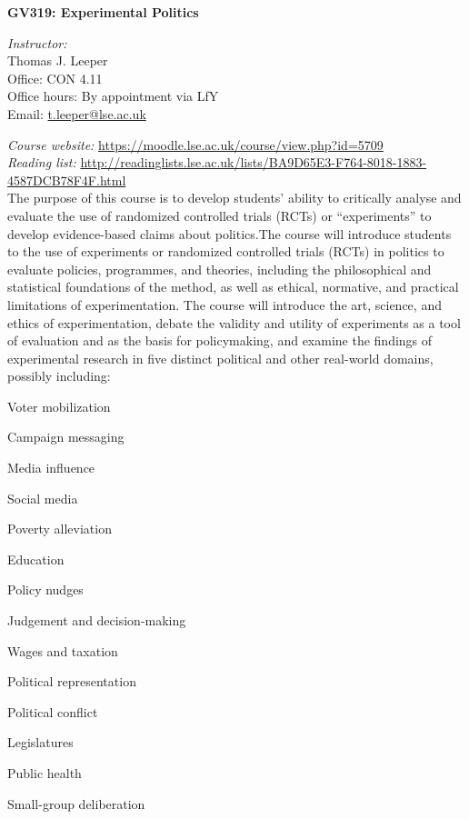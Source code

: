 \documentclass[12pt,a4paper]{article}
\begin{document}
\nobibliography*
\faketableofcontents

\begin{center}
{\Large
\noindent \textbf{GV319: Experimental Politics}
}
\end{center}
\vspace{1em}

\noindent
\textit{Instructor:}\\
Thomas J. Leeper\\
Office: CON 4.11\\
Office hours: By appointment via LfY\\
Email: \href{mailto:t.leeper@lse.ac.uk}{t.leeper@lse.ac.uk}

\vspace{1em}

\noindent \textit{Course website:} \url{https://moodle.lse.ac.uk/course/view.php?id=5709} \\
\noindent \textit{Reading list:} \url{http://readinglists.lse.ac.uk/lists/BA9D65E3-F764-8018-1883-4587DCB78F4F.html}\\

\noindent The purpose of this course is to develop students' ability to critically analyse and evaluate the use of randomized controlled trials (RCTs) or ``experiments'' to develop evidence-based claims about politics.The course will introduce students to the use of experiments or randomized controlled trials (RCTs) in politics to evaluate policies, programmes, and theories, including the philosophical and statistical foundations of the method, as well as ethical, normative, and practical limitations of experimentation. The course will introduce the art, science, and ethics of experimentation, debate the validity and utility of experiments as a tool of evaluation and as the basis for policymaking, and examine the findings of experimental research in five distinct political and other real-world domains, possibly including:

\begin{enumerate*}
\item Voter mobilization
\item Campaign messaging
\item Media influence
\item Social media
\item Poverty alleviation
\item Education
\item Policy nudges
\item Judgement and decision-making
\item Wages and taxation
\item Political representation
\item Political conflict
\item Legislatures
\item Public health
\item Small-group deliberation
\end{enumerate*}
\end{document}
